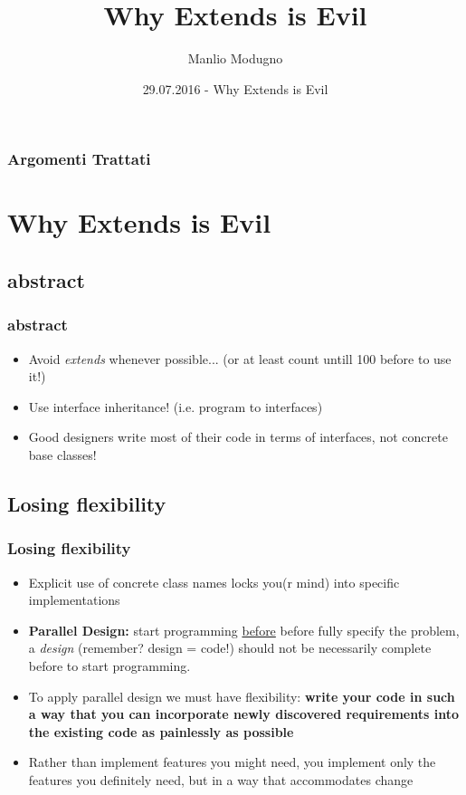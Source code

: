 \documentclass{beamer}
\title{Why Extends is Evil}
\author{Manlio Modugno}
\institute[GMTechnologies]
\date[29.07.2016] 
{29.07.2016 - Why Extends is Evil}
\begin{document}
\begin{frame}
  \titlepage
\end{frame}

\begin{frame}
  \frametitle{Argomenti Trattati}
  \tableofcontents
\end{frame}

\section{Why Extends is Evil}
\subsection{abstract}
\begin{frame}
  \frametitle{abstract}
  \begin{itemize}
	\item<+-> Avoid \textit{extends} whenever possible... (or at least count untill 100 before to use it!)
	\item<+-> Use interface inheritance! (i.e. program to interfaces)
	\item<+-> Good designers write most of their code in terms of interfaces, not concrete base classes!
  \end{itemize}
\end{frame}

\subsection{Losing flexibility}
\begin{frame}
  \frametitle{Losing flexibility}
  \begin{itemize}
  		\item<+-> Explicit use of concrete class names locks you(r mind) into specific implementations
		\item<+-> \textbf{Parallel Design:} start programming \underline{before} before fully specify the problem, a \textit{design} (remember? design = code!) should not be necessarily complete before to start programming.
		\item<+-> To apply parallel design we must have flexibility: \textbf{write your code in such a way that you can incorporate newly discovered requirements into the existing code as painlessly as possible}
		\item<+-> Rather than implement features you might need, you implement only the features you definitely need, but in a way that accommodates change
  \end{itemize}
\end{frame}
\end{document}
